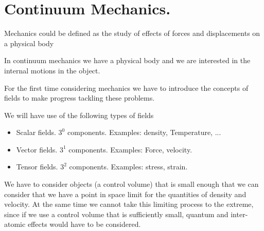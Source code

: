 % 
% 
% 
% 
% 
% 
% 
% 
% 
% 
% 
% 

\section{Continuum Mechanics.}

Mechanics could be defined as the study of effects of forces and displacements on a physical body


In continuum mechanics we have a physical body and we are interested in the internal motions in the object.


For the first time considering mechanics we have to introduce the concepts of fields to make progress tackling these problems.

We will have use of the following types of fields

\begin{itemize}
\item Scalar fields.  $3^0$ components.  Examples: density, Temperature, ...
\item Vector fields.  $3^1$ components.  Examples: Force, velocity.
\item Tensor fields.  $3^2$ components.  Examples: stress, strain.
\end{itemize}

We have to consider objects (a control volume) that is small enough that we can consider that we have a point in space limit for the quantities of density and velocity.  At the same time we cannot take this limiting process to the extreme, since if we use a control volume that is sufficiently small, quantum and inter-atomic effects would have to be considered.

